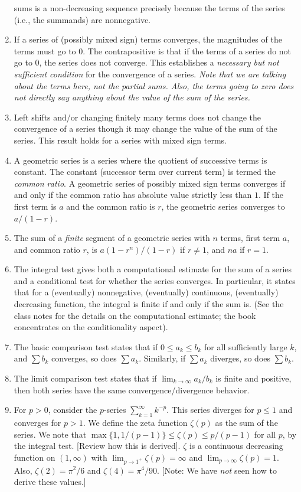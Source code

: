 \documentclass[10pt]{amsart}
\begin{document}
\begin{enumerate}
  sums is a non-decreasing sequence precisely because the terms of the
  series (i.e., the summands) are nonnegative.
\item If a series of (possibly mixed sign) terms converges, the
  magnitudes of the terms must go to $0$. The contrapositive is that
  if the terms of a series do not go to $0$, the series does not
  converge. This establishes a {\em necessary but not sufficient
  condition} for the convergence of a series. {\em Note that we are
  talking about the terms here, not the partial sums. Also, the terms
  going to zero does not directly say anything about the value of the
  sum of the series.}
\item Left shifts and/or changing finitely many terms does not change
  the convergence of a series though it may change the value of the
  sum of the series. This result holds for a series with mixed sign
  terms.
\item A geometric series is a series where the quotient of successive
  terms is constant. The constant (successor term over current term)
  is termed the {\em common ratio}. A geometric series of possibly
  mixed sign terms converges if and only if the common ratio has
  absolute value strictly less than $1$. If the first term is $a$ and
  the common ratio is $r$, the geometric series converges to $a/(1 -
  r)$.
\item The sum of a {\em finite} segment of a geometric series with $n$
  terms, first term $a$, and common ratio $r$, is $a(1 - r^n)/(1 - r)$
  if $r \ne 1$, and $na$ if $r = 1$.
\item The integral test gives both a computational estimate for the
  sum of a series and a conditional test for whether the series
  converges. In particular, it states that for a (eventually)
  nonnegative, (eventually) continuous, (eventually) decreasing
  function, the integral is finite if and only if the sum is. (See the
  class notes for the details on the computational estimate; the book
  concentrates on the conditionality aspect).
\item The basic comparison test states that if $0 \le a_k \le b_k$ for
  all sufficiently large $k$, and $\sum b_k$ converges, so does $\sum
  a_k$. Similarly, if $\sum a_k$ diverges, so does $\sum b_k$.
\item The limit comparison test states that if $\lim_{k \to \infty}
  a_k/b_k$ is finite and positive, then both series have the same
  convergence/divergence behavior.
\item For $p > 0$, consider the $p$-series $\sum_{k=1}^\infty
  k^{-p}$. This series diverges for $p \le 1$ and converges for $p >
  1$. We define the zeta function $\zeta(p)$ as the sum of the
  series. We note that $\max \{ 1, 1/(p-1) \} \le \zeta(p) \le
  p/(p-1)$ for all $p$, by the integral test. [Review how this is
  derived]. $\zeta$ is a continuous decreasing function on
  $(1,\infty)$ with $\lim_{p \to 1^+} \zeta(p) = \infty$ and $\lim_{p
  \to \infty} \zeta(p) = 1$. Also, $\zeta(2) = \pi^2/6$ and $\zeta(4)
  = \pi^4/90$. [Note: We have {\em not} seen how to derive these values.]
\end{enumerate}
\end{document}
